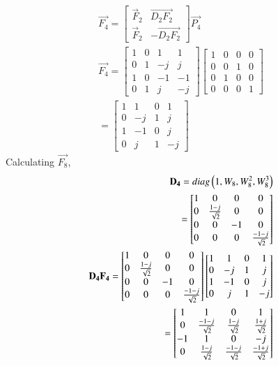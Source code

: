 \documentclass[journal,12pt,twocolumn]{IEEEtran}
\renewcommand\thesection{\arabic{section}}
\begin{document}
\begin{enumerate}[label=\arabic*.,ref=\thesection.\theenumi]
\begin{align}
		\vec{F_4}=\begin{bmatrix}
			\vec{F}_{2} & \vec{D_2F_2} \\
			\vec{F}_{2} & -\vec{D_2F_2}
		\end{bmatrix}\vec{P_4}\\
		\vec{F_4}=\begin{bmatrix}
			1&0&1&1\\0&1&-j&j\\1&0&-1&-1\\0&1&j&-j
		\end{bmatrix}\begin{bmatrix}
			1&0&0&0\\0&0&1&0\\0&1&0&0\\0&0&0&1
		\end{bmatrix}\\
		=\begin{bmatrix}
			1&1&0&1\\0&-j&1&j\\1&-1&0&j\\0&j&1&-j
		\end{bmatrix}
	\end{align}
	Calculating $\vec{F_8}$,
	\begin{align}
		\mathbf{D_4}=diag\left(1,W_8,W_8^2,W_8^3\right)\\
		=\begin{bmatrix}
			1&0&0&0\\0&\frac{1-j}{\sqrt{2}}&0&0\\0&0&-1&0\\0&0&0&\frac{-1-j}{\sqrt{2}}
		\end{bmatrix}\\
		\mathbf{D_4F_4}=\begin{bmatrix}
			1&0&0&0\\0&\frac{1-j}{\sqrt{2}}&0&0\\0&0&-1&0\\0&0&0&\frac{-1-j}{\sqrt{2}}
		\end{bmatrix}\begin{bmatrix}
			1&1&0&1\\0&-j&1&j\\1&-1&0&j\\0&j&1&-j
		\end{bmatrix}\\
		=\begin{bmatrix}
			1&1&0&1\\0&\frac{-1-j}{\sqrt{2}}&\frac{1-j}{\sqrt{2}}&\frac{1+j}{\sqrt{2}}\\-1&1&0&-j\\0&\frac{1-j}{\sqrt{2}}&\frac{-1-j}{\sqrt{2}}&\frac{-1+j}{\sqrt{2}}

\end{bmatrix}
\end{align}
\end{enumerate}
\end{document}
